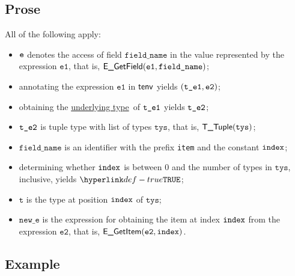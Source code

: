 \documentclass{book}
\newcommand\ProseOrTypeError[0]{\ProseTerminateAs{\TypeErrorConfig}}
\newcommand\underlyingtype[0]{\hyperlink{def-underlyingtype}{underlying type}}
\newcommand\vt[0]{\texttt{t}}
\newcommand\veone[0]{\texttt{e1}}
\newcommand\vetwo[0]{\texttt{e2}}
\newcommand\fieldname[0]{\texttt{field\_name}}
\newcommand\newe[0]{\texttt{new\_e}}
\newcommand\tys[0]{\texttt{tys}}
\begin{document}
\subsection{Prose}
All of the following apply:
\begin{itemize}
  \item $\texttt{e}$ denotes the access of field $\fieldname$ in the value represented by the expression $\veone$, that is, $\EGetField(\veone, \fieldname)$;
  \item annotating the expression $\veone$ in $\textsf{tenv}$ yields $(\vteone, \vetwo)$\ProseOrTypeError;
  \item obtaining the \underlyingtype\ of $\texttt{t\_e1}$ yields $\texttt{t\_e2}$\ProseOrTypeError;
  \item $\texttt{t\_e2}$ is tuple type with list of types $\tys$, that is, $\TTuple(\tys)$;
  \item $\fieldname$ is an identifier with the prefix \texttt{item} and the constant $\texttt{index}$;
  \item determining whether $\texttt{index}$ is between $0$ and the number of types in $\tys$, inclusive, yields $\True$\ProseOrTypeError;
  \item $\vt$ is the type at position $\texttt{index}$ of $\tys$;
  \item $\newe$ is the expression for obtaining the item at index $\texttt{index}$ from the expression $\vetwo$, that is, $\EGetItem(\vetwo, \vindex)$.
\end{itemize}

\subsection{Example}

\end{document}
